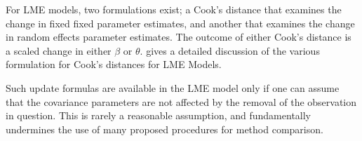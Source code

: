 \documentclass[12pt, a4paper]{report}
\theoremstyle{definition}
\theoremstyle{remark}
\begin{document}
For LME models, two formulations exist; a Cook's distance that examines the change in fixed fixed parameter estimates, and another that examines the change in random effects parameter estimates. The outcome of either Cook's distance is a scaled change in either $\beta$ or $\theta$. \citet{Zewotir} gives a detailed discussion of the various formulation for Cook's distances for LME Models.

Such update formulas are available in the LME model only if one can assume that the covariance parameters are not affected by the removal of the observation in question. This is rarely a reasonable assumption, and fundamentally undermines the use of many proposed procedures for method comparison.


%


\end{document}
